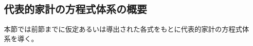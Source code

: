 
\subsection{代表的家計の方程式体系の概要}
\label{sec:chapter3_representative_household_overview}
本節では前節までに仮定あるいは導出された各式をもとに代表的家計の方程式体系を導く。